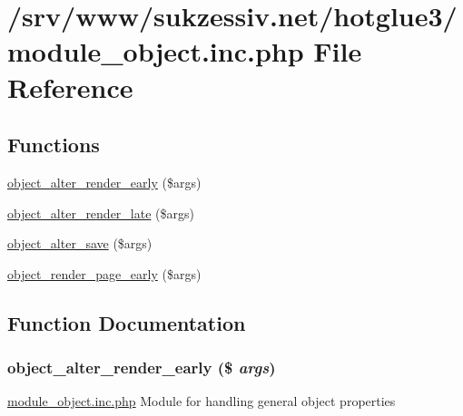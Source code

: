 \hypertarget{module__object_8inc_8php}{
\section{/srv/www/sukzessiv.net/hotglue3/module\_\-object.inc.php File Reference}
\label{module__object_8inc_8php}
}
\subsection*{Functions}
\begin{CompactItemize}
\item 
\hyperlink{module__object_8inc_8php_6acc3273ff9872e01527162375d318d8}{object\_\-alter\_\-render\_\-early} (\$args)
\item 
\hyperlink{module__object_8inc_8php_6b5bf16a15b7d5809bd7c6d15cd05a52}{object\_\-alter\_\-render\_\-late} (\$args)
\item 
\hyperlink{module__object_8inc_8php_ba3a00b339dc7e9831b48a94f4f8e211}{object\_\-alter\_\-save} (\$args)
\item 
\hyperlink{module__object_8inc_8php_d06c13f1778d655f4a011d1763c6e618}{object\_\-render\_\-page\_\-early} (\$args)
\end{CompactItemize}


\subsection{Function Documentation}
\hypertarget{module__object_8inc_8php_6acc3273ff9872e01527162375d318d8}{
\subsubsection[{object\_\-alter\_\-render\_\-early}]{\setlength{\rightskip}{0pt plus 5cm}object\_\-alter\_\-render\_\-early (\$ {\em args})}}
\label{module__object_8inc_8php_6acc3273ff9872e01527162375d318d8}


\hyperlink{module__object_8inc_8php}{module\_\-object.inc.php} Module for handling general object properties

